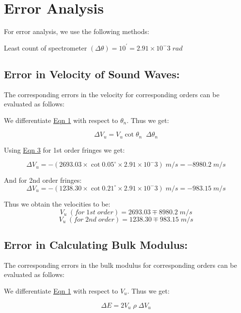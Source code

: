 \section{Error Analysis}

	For error analysis, we use the following methods:

	Least count of spectrometer $(\Delta \theta) = 10^{'} = 2.91 \times 10^-3 \; rad$

	\subsection{Error in Velocity of Sound Waves:}
		The corresponding errors in the velocity for corresponding orders can be evaluated as follows:

		\vspace{3mm}
		We differentiate \hyperref[eqn:1]{Eqn 1} with respect to $\theta_n$. Thus we get:

		\begin{equation}
			\Delta V_u = V_u \cot \theta_n\;\;\Delta\theta_n
		\end{equation}\label{eqn:3}

		Using \hyperref[eqn:3]{Eqn 3} for 1st order fringes we get:
		
		\vspace{-5mm}
		$$\Delta V_u = -(2693.03 \times \cot0.05^\circ \times 2.91 \times 10^-3) \; m/s = -8980.2 \; m/s$$

		And for 2nd order fringes:
		$$\Delta V_u = -(1238.30 \times \cot0.21^\circ \times 2.91 \times 10^-3) \; m/s = -983.15 \; m/s$$

		Thus we obtain the velocities to be:
		$$V_u\;(for\;1st\;order) = 2693.03 \mp 8980.2\;m/s$$
		$$V_u\;(for\;2nd\;order) = 1238.30 \mp 983.15\;m/s$$

	\subsection{Error in Calculating Bulk Modulus:}
	The corresponding errors in the bulk modulus for corresponding orders can be evaluated as follows:

	\vspace{3mm}
	We differentiate \hyperref[eqn:1]{Eqn 1} with respect to $V_u$. Thus we get:

	\begin{equation}
		\Delta E = 2V_u \; \rho \;\Delta V_u
	\end{equation}\label{eqn:4}

